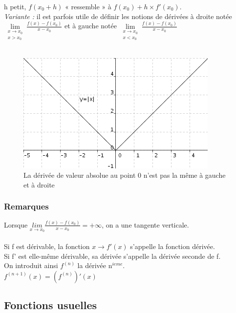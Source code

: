 \documentclass[a4paper,10pt]{book}
\begin{document}
h petit, $f(x_{0}+h)$ « ressemble » à $f(x_{0})+h\times f'(x_{0})$.\\

\emph{Variante :} il est parfois utile de définir les notions de dérivées à droite notée $\lim\limits_{\substack{x \rightarrow x_{0} \\ x>x_{0}}} \frac{f(x)-f(x_{0})}{x-x_{0}}$ et à gauche notée $\lim\limits_{\substack{x \rightarrow x_{0} \\ x<x_{0}}} \frac{f(x)-f(x_{0})}{x-x_{0}}$\\ \
\begin{figure}[h]
\begin{center}
\includegraphics[scale=1]{images/004.png}
\caption{La dérivée de valeur absolue au point 0 n'est pas la même à gauche et à droite}
\end{center}
\end{figure}

\subsubsection*{Remarques}
Lorsque $\underset{x\rightarrow x_{0}}{lim} \frac{f(x)-f(x_{0})}{x-x_{0}} = +\infty$, on a une tangente verticale.\\ \\
Si f est dérivable, la fonction $x \longrightarrow f'(x)$ s'appelle la fonction dérivée.\\
Si f' est elle-même dérivable, sa dérivée s'appelle la dérivée seconde de f.\\
On introduit ainsi $f^{(n)}$ la dérivée n$^{ieme}$.\\
$f^{(n+1)}(x)=(f^{(n)})'(x)$

\newpage

\subsection{Fonctions usuelles}
\end{document}
